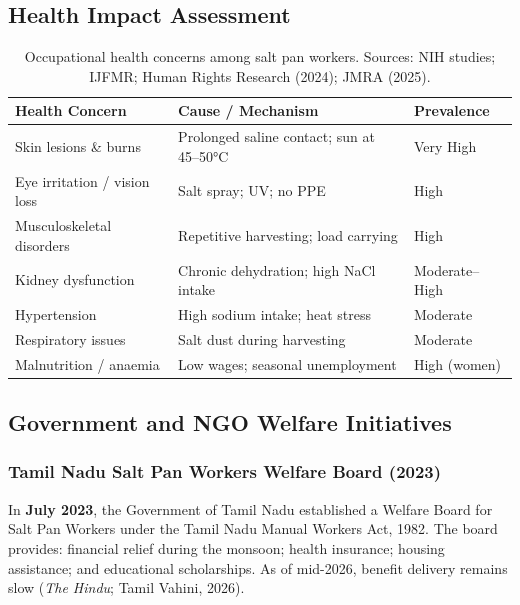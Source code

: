 \documentclass[12pt,a4paper]{article}
\begin{document}
\subsection{Health Impact Assessment}

\begin{table}[H]
\centering
\caption{Occupational health concerns among salt pan workers.
Sources: NIH studies; IJFMR; Human Rights Research (2024); JMRA (2025).}
\smallskip
\begin{tabular}{L{3.5cm} L{6cm} C{2.5cm}}
\toprule
{}
\color{white}\textbf{Health Concern} &
\color{white}\textbf{Cause / Mechanism} &
\color{white}\textbf{Prevalence} \\
\midrule
Skin lesions \& burns & Prolonged saline contact; sun at 45--50°C & Very High \\
Eye irritation / vision loss & Salt spray; UV; no PPE & High \\
Musculoskeletal disorders & Repetitive harvesting; load carrying & High \\
Kidney dysfunction & Chronic dehydration; high NaCl intake & Moderate--High \\
Hypertension & High sodium intake; heat stress & Moderate \\
Respiratory issues & Salt dust during harvesting & Moderate \\
Malnutrition / anaemia & Low wages; seasonal unemployment & High (women) \\
\bottomrule
\end{tabular}
\end{table}

\subsection{Government and NGO Welfare Initiatives}

\subsubsection{Tamil Nadu Salt Pan Workers Welfare Board (2023)}

In \textbf{July 2023}, the Government of Tamil Nadu established a Welfare Board for
Salt Pan Workers under the Tamil Nadu Manual Workers Act, 1982. The board provides:
financial relief during the monsoon; health insurance; housing assistance; and educational
scholarships. As of mid-2026, benefit delivery remains slow (\textit{The Hindu}; Tamil Vahini, 2026).
\end{document}
